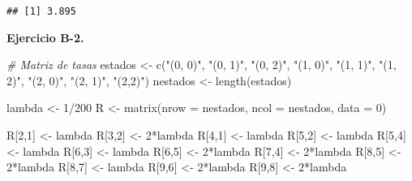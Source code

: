 \documentclass[
]{book}
\newenvironment{Shaded}{\begin{snugshade}}{\end{snugshade}}
\newcommand{\AttributeTok}[1]{\textcolor[rgb]{0.77,0.63,0.00}{#1}}
\newcommand{\CommentTok}[1]{\textcolor[rgb]{0.56,0.35,0.01}{\textit{#1}}}
\newcommand{\DecValTok}[1]{\textcolor[rgb]{0.00,0.00,0.81}{#1}}
\newcommand{\FunctionTok}[1]{\textcolor[rgb]{0.00,0.00,0.00}{#1}}
\newcommand{\NormalTok}[1]{#1}
\newcommand{\OtherTok}[1]{\textcolor[rgb]{0.56,0.35,0.01}{#1}}
\newcommand{\SpecialCharTok}[1]{\textcolor[rgb]{0.00,0.00,0.00}{#1}}
\newcommand{\StringTok}[1]{\textcolor[rgb]{0.31,0.60,0.02}{#1}}
\theoremstyle{definition}
\theoremstyle{definition}
\theoremstyle{definition}
\theoremstyle{definition}
\theoremstyle{remark}
\begin{document}
\begin{verbatim}
## [1] 3.895
\end{verbatim}

\textbf{Ejercicio B-2.}

\begin{Shaded}
\begin{Highlighting}[]
\CommentTok{\# Matriz de tasas}
\NormalTok{estados }\OtherTok{\textless{}{-}} \FunctionTok{c}\NormalTok{(}\StringTok{"(0, 0)"}\NormalTok{, }\StringTok{"(0, 1)"}\NormalTok{, }\StringTok{"(0, 2)"}\NormalTok{, }\StringTok{"(1, 0)"}\NormalTok{, }
             \StringTok{"(1, 1)"}\NormalTok{, }\StringTok{"(1, 2)"}\NormalTok{, }\StringTok{"(2, 0)"}\NormalTok{, }\StringTok{"(2, 1)"}\NormalTok{, }\StringTok{"(2,2)"}\NormalTok{)}
\NormalTok{nestados }\OtherTok{\textless{}{-}} \FunctionTok{length}\NormalTok{(estados)}

\NormalTok{lambda }\OtherTok{\textless{}{-}} \DecValTok{1}\SpecialCharTok{/}\DecValTok{200}
\NormalTok{R }\OtherTok{\textless{}{-}} \FunctionTok{matrix}\NormalTok{(}\AttributeTok{nrow =}\NormalTok{ nestados, }\AttributeTok{ncol =}\NormalTok{ nestados, }\AttributeTok{data =} \DecValTok{0}\NormalTok{)}

\NormalTok{R[}\DecValTok{2}\NormalTok{,}\DecValTok{1}\NormalTok{] }\OtherTok{\textless{}{-}}\NormalTok{ lambda }
\NormalTok{R[}\DecValTok{3}\NormalTok{,}\DecValTok{2}\NormalTok{] }\OtherTok{\textless{}{-}} \DecValTok{2}\SpecialCharTok{*}\NormalTok{lambda }
\NormalTok{R[}\DecValTok{4}\NormalTok{,}\DecValTok{1}\NormalTok{] }\OtherTok{\textless{}{-}}\NormalTok{ lambda }
\NormalTok{R[}\DecValTok{5}\NormalTok{,}\DecValTok{2}\NormalTok{] }\OtherTok{\textless{}{-}}\NormalTok{ lambda }
\NormalTok{R[}\DecValTok{5}\NormalTok{,}\DecValTok{4}\NormalTok{] }\OtherTok{\textless{}{-}}\NormalTok{ lambda }
\NormalTok{R[}\DecValTok{6}\NormalTok{,}\DecValTok{3}\NormalTok{] }\OtherTok{\textless{}{-}}\NormalTok{ lambda }
\NormalTok{R[}\DecValTok{6}\NormalTok{,}\DecValTok{5}\NormalTok{] }\OtherTok{\textless{}{-}} \DecValTok{2}\SpecialCharTok{*}\NormalTok{lambda}
\NormalTok{R[}\DecValTok{7}\NormalTok{,}\DecValTok{4}\NormalTok{] }\OtherTok{\textless{}{-}} \DecValTok{2}\SpecialCharTok{*}\NormalTok{lambda}
\NormalTok{R[}\DecValTok{8}\NormalTok{,}\DecValTok{5}\NormalTok{] }\OtherTok{\textless{}{-}} \DecValTok{2}\SpecialCharTok{*}\NormalTok{lambda}
\NormalTok{R[}\DecValTok{8}\NormalTok{,}\DecValTok{7}\NormalTok{] }\OtherTok{\textless{}{-}}\NormalTok{ lambda}
\NormalTok{R[}\DecValTok{9}\NormalTok{,}\DecValTok{6}\NormalTok{] }\OtherTok{\textless{}{-}} \DecValTok{2}\SpecialCharTok{*}\NormalTok{lambda}
\NormalTok{R[}\DecValTok{9}\NormalTok{,}\DecValTok{8}\NormalTok{] }\OtherTok{\textless{}{-}} \DecValTok{2}\SpecialCharTok{*}\NormalTok{lambda}
\end{Highlighting}
\end{Shaded}
\end{document}
